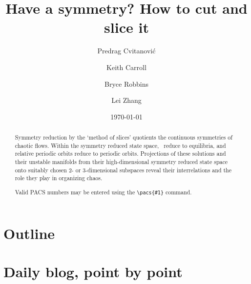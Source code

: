 \documentclass[twocolumn,
secnumarabic,
nofootinbib, tightenlines,
nobibnotes, showkeys, aps,
cha]{revtex4-1}
\begin{document}
\title[How to cut and slice a symmetry]
{Have a symmetry? How to cut and slice it}


\author{Predrag Cvitanovi{\'c}}
\author{Keith Carroll}
\author{Bryce Robbins}
\author{Lei Zhang}

\date{\today}

\begin{abstract}
Symmetry reduction by the `method of slices'
quotients the continuous symmetries of chaotic flows. Within the
symmetry reduced state space, \reqva\ reduce to
equilibria, and relative periodic orbits reduce to periodic orbits.
Projections of these solutions and their unstable manifolds from their
high-dimensional symmetry reduced state space onto suitably chosen 2-
or 3-dimensional subspaces reveal their interrelations and the role they
play in organizing chaos.

%
Valid PACS numbers may be entered using the \verb+\pacs{#1}+ command.
\end{abstract}

\maketitle








% 


\ifdraft
    \onecolumngrid
    \newpage
    \section{Outline}
    \label{chap:outline}


    \newpage


    \newpage
    \section{Daily blog, point by point}
    \label{chap:atlas}

\fi
\end{document}
